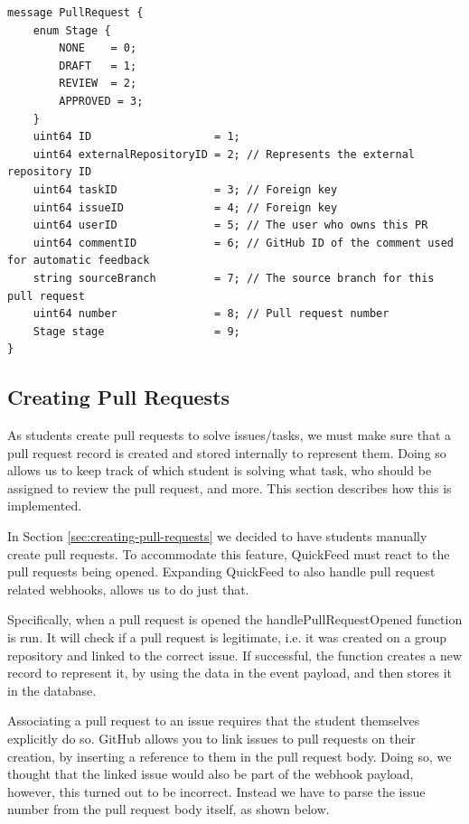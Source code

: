 \begin{lstlisting}[caption={PullRequest message}]
message PullRequest {
    enum Stage {
        NONE    = 0;
        DRAFT   = 1;
        REVIEW  = 2;
        APPROVED = 3;
    }
    uint64 ID                   = 1;
    uint64 externalRepositoryID = 2; // Represents the external repository ID
    uint64 taskID               = 3; // Foreign key
    uint64 issueID              = 4; // Foreign key
    uint64 userID               = 5; // The user who owns this PR
    uint64 commentID            = 6; // GitHub ID of the comment used for automatic feedback
    string sourceBranch         = 7; // The source branch for this pull request
    uint64 number               = 8; // Pull request number
    Stage stage                 = 9;
}
\end{lstlisting}


\subsection{Creating Pull Requests}

As students create pull requests to solve issues/tasks, we must make sure that a pull request record is created and stored internally to represent them.
Doing so allows us to keep track of which student is solving what task, who should be assigned to review the pull request, and more.
This section describes how this is implemented.

In Section \ref{sec:creating-pull-requests} we decided to have students manually create pull requests.
To accommodate this feature, QuickFeed must react to the pull requests being opened.
Expanding QuickFeed to also handle pull request related webhooks, allows us to do just that.

Specifically, when a pull request is opened the handlePullRequestOpened function is run.
It will check if a pull request is legitimate, i.e. it was created on a group repository and linked to the correct issue.
If successful, the function creates a new record to represent it, by using the data in the event payload, and then stores it in the database.

Associating a pull request to an issue requires that the student themselves explicitly do so.
GitHub allows you to link issues to pull requests on their creation, by inserting a reference to them in the pull request body.
Doing so, we thought that the linked issue would also be part of the webhook payload, however, this turned out to be incorrect.
Instead we have to parse the issue number from the pull request body itself, as shown below.

